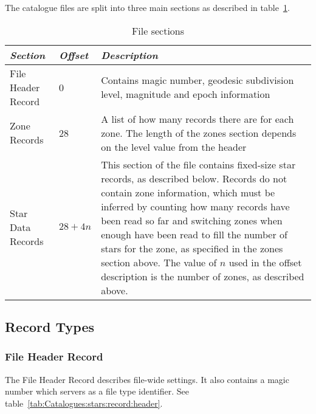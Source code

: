 The catalogue files are split into three main sections as described in
table~\ref{tab:Catalogues:stars:sections}.

\begin{table}[htb]
\begin{tabularx}{\textwidth}{l l X}\toprule
\emph{Section} & \emph{Offset} & \emph{Description}\\\midrule
File Header Record &  0        & Contains magic number, geodesic subdivision level, magnitude and epoch information\\%
Zone Records       & 28        & A list of how many records there are for each zone.
                                 The length of the zones section depends on the level value from the header\\%
Star Data Records  & $28+4n$   & This section of the file contains fixed-size star records, as described below. 
                                 Records do not contain zone information, which must be inferred by counting 
                                 how many records have been read so far and switching zones when enough have been read 
                                 to fill the number of stars for the zone, as specified in the zones section above. 
                                 The value of $n$ used in the offset description is the number of zones, as described above.\\\bottomrule
\end{tabularx}
\caption{File sections}
\label{tab:Catalogues:stars:sections}
\end{table}

\subsection{Record Types}%
\label{sec:Catalogues:stars:record:types}

\subsubsection{File Header Record}%
\label{sec:Catalogues:stars:record:header}

The File Header Record describes file-wide settings. It also contains a
magic number which servers as a file type identifier. See table~\ref{tab:Catalogues:stars:record:header}.

